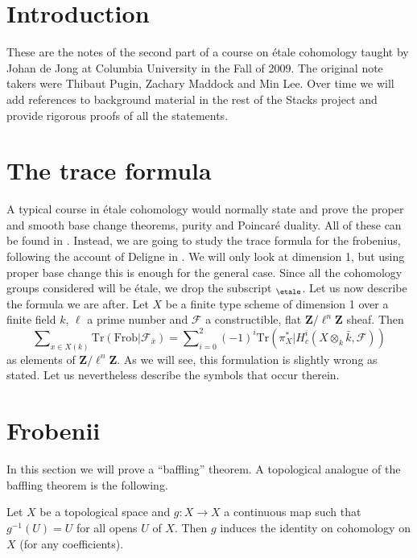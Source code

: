 \section{Introduction}
\label{trace-section-introduction}
These are the notes of the second part of a course on \'etale cohomology
taught by Johan de Jong at Columbia University in the Fall of 2009. The
original note takers were Thibaut Pugin, Zachary Maddock and Min Lee.
Over time we will add references to background material in the rest of the
Stacks project and provide rigorous proofs of all the statements.

\section{The trace formula}
\label{trace-section-trace-formula}
A typical course in \'etale cohomology would normally state and prove the
proper and smooth base change theorems, purity and Poincar\'e duality. All of
these can be found in \cite[Arcata]{SGA4.5}. Instead, we are going to study the
trace formula for the frobenius, following the account of Deligne in
\cite[Rapport]{SGA4.5}. We will only look at dimension 1, but using proper base
change this is enough for the general case. Since all the cohomology groups
considered will be \'etale, we drop the subscript $_\etale$. Let us
now describe
the formula we are after. Let $X$ be a finite type scheme of dimension 1 over a
finite field $k$, $\ell$ a prime number and $\mathcal{F}$ a constructible, flat
$\mathbf{Z}/\ell^n\mathbf{Z}$ sheaf. Then
\begin{equation}
\label{equation-trace-formula-initial}
\sum\nolimits_{x \in X(k)}
\text{Tr}(\text{Frob} | \mathcal{F}_{\bar x}) =
\sum\nolimits_{i = 0}^2
(-1)^i \text{Tr}(\pi_X^* | H^i_c(X \otimes_k \bar k, \mathcal{F}))
\end{equation}
as elements of $\mathbf{Z}/\ell^n\mathbf{Z}$. As we will see, this formulation
is slightly wrong as stated. Let us nevertheless describe the symbols that
occur therein.

\section{Frobenii}
\label{trace-section-frobenii}
In this section we will prove a ``baffling'' theorem.
A topological analogue of the baffling theorem is the following.

\begin{exercise}
\label{exercise-baffling}
Let $X$ be a topological space and $g : X \to X$ a continuous map such that
$g^{-1}(U) = U$ for all opens $U$ of $X$. Then $g$ induces the identity on
cohomology on $X$ (for any coefficients).
\end{exercise}

